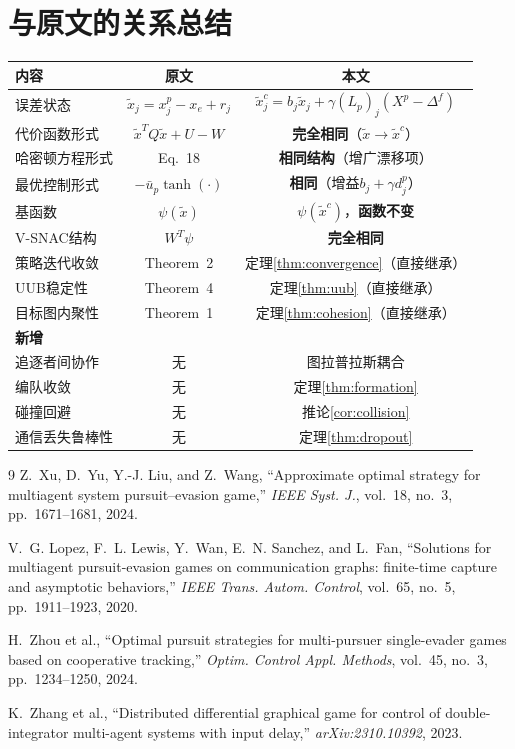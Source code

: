 \documentclass[11pt,a4paper]{article}
\newcommand{\ub}{\bar{u}}
\begin{document}
\section{与原文的关系总结}

\begin{center}
\begin{tabular}{l|c|c}
\hline
\textbf{内容} & \textbf{原文} & \textbf{本文} \\
\hline
误差状态 & $\tilde{x}_j = x_j^p - x_e + r_j$
         & $\tilde{x}_j^c = b_j\tilde{x}_j
           + \gamma (L_p)_j (X^p - \Delta^f)$ \\
代价函数形式 & $\tilde{x}^T Q \tilde{x} + U - W$
             & \textbf{完全相同}（$\tilde{x} \to \tilde{x}^c$） \\
哈密顿方程形式 & Eq.~18 & \textbf{相同结构}（增广漂移项） \\
最优控制形式 & $-\ub_p \tanh(\cdot)$ & \textbf{相同}（增益$b_j + \gamma d_j^p$） \\
基函数 & $\psi(\tilde{x})$ & $\psi(\tilde{x}^c)$，\textbf{函数不变} \\
V-SNAC结构 & $W^T \psi$ & \textbf{完全相同} \\
策略迭代收敛 & Theorem~2 & 定理\ref{thm:convergence}（直接继承） \\
UUB稳定性 & Theorem~4 & 定理\ref{thm:uub}（直接继承） \\
目标图内聚性 & Theorem~1 & 定理\ref{thm:cohesion}（直接继承） \\
\hline
\textbf{新增} & & \\
\hline
追逐者间协作 & 无 & 图拉普拉斯耦合 \\
编队收敛 & 无 & 定理\ref{thm:formation} \\
碰撞回避 & 无 & 推论\ref{cor:collision} \\
通信丢失鲁棒性 & 无 & 定理\ref{thm:dropout} \\
\hline
\end{tabular}
\end{center}


\begin{thebibliography}{9}
Z.~Xu, D.~Yu, Y.-J. Liu, and Z.~Wang,
``Approximate optimal strategy for multiagent system pursuit--evasion game,''
\textit{IEEE Syst. J.}, vol.~18, no.~3, pp.~1671--1681, 2024.

V.~G. Lopez, F.~L. Lewis, Y.~Wan, E.~N. Sanchez, and L.~Fan,
``Solutions for multiagent pursuit-evasion games on communication graphs:
finite-time capture and asymptotic behaviors,''
\textit{IEEE Trans. Autom. Control}, vol.~65, no.~5, pp.~1911--1923, 2020.

H.~Zhou et al.,
``Optimal pursuit strategies for multi-pursuer single-evader games
based on cooperative tracking,''
\textit{Optim. Control Appl. Methods}, vol.~45, no.~3, pp.~1234--1250, 2024.

K.~Zhang et al.,
``Distributed differential graphical game for control of
double-integrator multi-agent systems with input delay,''
\textit{arXiv:2310.10392}, 2023.
\end{thebibliography}
\end{document}
